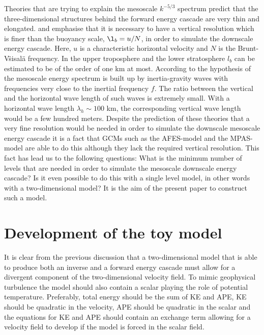 Theories that are trying to explain the mesoscale $ k^{-5/3} $ spectrum predict that the three-dimensional structures behind the forward energy cascade are very thin and elongated. \citet{Lindborg:2006} and 
\citet{Waite-Bartello:2004}  emphasise that  it is necessary to have a vertical resolution which is finer than the buoyancy scale, $ \l_b= u/N $, in order to simulate the downscale energy cascade. Here, $ u $ is a characteristic horizontal velocity and $ N $ is the Brunt-V\"sisal\"a frequency. In the upper troposphere and the lower stratosphere $ l_b $ can be estimated to be of the order of one km at most.  According to the hypothesis  of \citet{Callies-Buhler-Ferrari:2016} the mesoscale energy spectrum is built up by inertia-gravity waves with frequencies very close to the inertial frequency $ f $. The ratio between the vertical and the horizontal wave length of such waves is extremely small. With a horizontal wave length $ \lambda_{h} \sim 100 $ km, the corresponding vertical wave length would be a few hundred meters. Despite the prediction of these theories that a very fine resolution would be needed in order to simulate the downscale mesoscale energy cascade it is a fact that GCMs such as the AFES-model and the MPAS-model \citep{Skamarock-Park-Klemp-Snyder:2014} are able to do this although they lack the required vertical resolution. This fact has lead us to the following questions: What is the minimum number of levels that are needed in order to simulate the mesoscale downscale energy cascade? Is it even possible to do this with a single level model, in other words with a two-dimensional model? It is the aim of the present paper to construct such a model.

\section{Development of the toy model}
It is clear from the previous discussion that  a  two-dimensional model that is able to produce both an inverse and a forward energy  cascade must allow for a divergent component of the two-dimensional velocity field. 
To mimic geophysical turbulence the model should also contain a scalar playing the role of potential temperature. Preferably, total energy should be the sum of KE and APE, KE should be quadratic in the velocity, APE should be quadratic in the scalar and the equations for KE and APE should contain an exchange term allowing for a velocity field to develop if the model is forced in the scalar field. 

